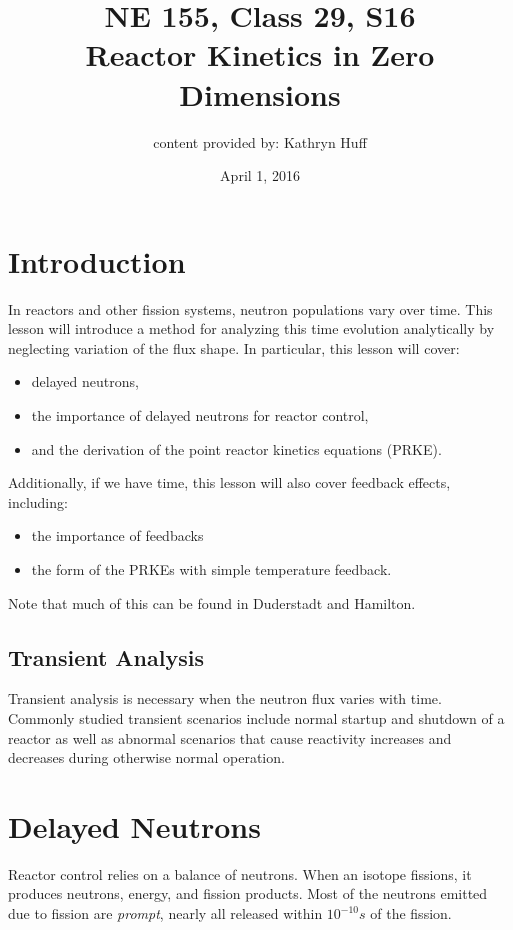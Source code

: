 \documentclass[12pt]{article}
\title{NE 155, Class 29, S16 \\
Reactor Kinetics in Zero Dimensions}
\date{April 1, 2016}
\begin{document}
\author{content provided by: Kathryn Huff}
\maketitle

\hrulefill

\section{Introduction}

In reactors and other fission systems, neutron populations vary over time. This 
lesson will introduce a method for analyzing this time evolution analytically 
by neglecting variation of the flux shape. In particular, this lesson will 
cover:

\begin{itemize}
\item delayed neutrons,
\item the importance of delayed neutrons for reactor control,
\item and the derivation of the point reactor kinetics equations (PRKE).
\end{itemize}

Additionally, if we have time, this lesson will also cover feedback effects, 
including: 
\begin{itemize}
\item the importance of feedbacks
\item the form of the PRKEs with simple temperature feedback.
\end{itemize}

Note that much of this can be found in Duderstadt and Hamilton.

\subsection{Transient Analysis}

Transient analysis is necessary when the neutron flux varies with time.
Commonly studied transient scenarios include normal startup and shutdown of a
reactor as well as abnormal scenarios that cause reactivity increases and
decreases during otherwise normal operation.

\section{Delayed Neutrons}
Reactor control relies on a balance of neutrons. When an isotope fissions, it 
produces neutrons, energy, and fission products.  Most of the neutrons emitted 
due to fission are \emph{prompt}, nearly all released within $10^{-10}s$ of the fission. 
\end{document}
